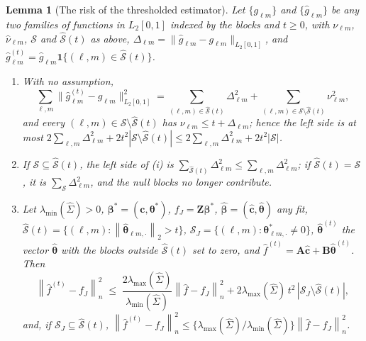 \documentclass[10pt]{book}
\newtheorem{lemma}{Lemma}[section]
\theoremstyle{definition}
\newcommand{\norm}[1]{\left\lVert #1 \right\rVert}
\newcommand{\normn}[1]{\left\lVert #1 \right\rVert_{n}}
\newcommand{\cv}{\ell}
\newcommand{\md}{m}
\newcommand{\bZ}{\mathbf{Z}}
\newcommand{\gcomp}[2]{g_{#1#2}}
\newcommand{\btheta}{\boldsymbol{\theta}}
\newcommand{\thetastar}{\btheta^{*}}
\newcommand{\thetahat}{\widehat{\btheta}}
\newcommand{\bbeta}{\boldsymbol{\beta}}
\newcommand{\betastar}{\bbeta^{*}}
\newcommand{\betahat}{\widehat{\bbeta}}
\newcommand{\bc}{\mathbf{c}}
\newcommand{\chat}{\widehat{\mathbf{c}}}
\newcommand{\Gramhat}{\widehat{\Sigma}}
\newcommand{\Amat}{\mathbf{A}}
\newcommand{\Bmat}{\mathbf{B}}
\newcommand{\lmin}{\lambda_{\min}}
\newcommand{\lmaxx}{\lambda_{\max}}
\newcommand{\Dbl}{\Delta_{\cv\md}}
\begin{document}
{%
\begin{lemma}[The risk of the thresholded estimator]
\label{lem:thrisk}
Let $\{\gcomp{\cv}{\md}\}$ and $\{\widehat{g}_{\cv\md}\}$ be any two families of
functions in $L_2[0,1]$ indexed by the blocks and $t \ge 0$, with
$\nu_{\cv\md}$, $\widehat{\nu}_{\cv\md}$, $\mathcal{S}$ and
$\widehat{\mathcal{S}}(t)$ as above, $\Dbl = \lVert\widehat{g}_{\cv\md} -
\gcomp{\cv}{\md}\rVert_{L_2[0,1]}$, and
$\widehat{g}^{(t)}_{\cv\md} = \widehat{g}_{\cv\md}
\mathbf{1}\{(\cv,\md)\in\widehat{\mathcal{S}}(t)\}$.
\begin{enumerate}
\item[(i)] With no assumption,
\[
  \sum_{\cv,\md}\bigl\lVert\widehat{g}^{(t)}_{\cv\md}-\gcomp{\cv}{\md}
  \bigr\rVert_{L_2[0,1]}^{2}
  = \sum_{(\cv,\md)\in\widehat{\mathcal{S}}(t)}\Dbl^{2}
  + \sum_{(\cv,\md)\in\mathcal{S}\setminus\widehat{\mathcal{S}}(t)}\nu_{\cv\md}^{2},
\]
and every $(\cv,\md) \in \mathcal{S}\setminus\widehat{\mathcal{S}}(t)$ has
$\nu_{\cv\md} \le t + \Dbl$; hence the left side is at most
$2\sum_{\cv,\md}\Dbl^{2} + 2t^{2}|\mathcal{S}\setminus\widehat{\mathcal{S}}(t)|
\le 2\sum_{\cv,\md}\Dbl^{2} + 2t^{2}|\mathcal{S}|$.
\item[(ii)] If $\mathcal{S} \subseteq \widehat{\mathcal{S}}(t)$, the left side
of (i) is $\sum_{\widehat{\mathcal{S}}(t)}\Dbl^{2} \le \sum_{\cv,\md}\Dbl^{2}$;
if $\widehat{\mathcal{S}}(t) = \mathcal{S}$, it is $\sum_{\mathcal{S}}\Dbl^{2}$,
and the null blocks no longer contribute.
\item[(iii)] Let $\lmin(\Gramhat) > 0$, $\betastar = (\bc,\thetastar)$,
$f_J = \bZ\betastar$, $\betahat = (\chat,\thetahat)$ any fit,
$\widehat{\mathcal{S}}(t) = \{(\cv,\md) : \norm{\thetahat_{\cv\md,\cdot}}_{2} > t\}$,
$\mathcal{S}_J = \{(\cv,\md) : \thetastar_{\cv\md,\cdot} \ne 0\}$,
$\thetahat^{(t)}$ the vector $\thetahat$ with the blocks outside
$\widehat{\mathcal{S}}(t)$ set to zero, and
$\widehat{f}^{(t)} = \Amat\chat + \Bmat\thetahat^{(t)}$. Then
\[
  \normn{\widehat{f}^{(t)}-f_J}^{2} \;\le\;
  \frac{2\lmaxx(\Gramhat)}{\lmin(\Gramhat)}\normn{\widehat{f}-f_J}^{2}
  + 2\lmaxx(\Gramhat)\,t^{2}\,|\mathcal{S}_J\setminus\widehat{\mathcal{S}}(t)|,
\]
and, if $\mathcal{S}_J \subseteq \widehat{\mathcal{S}}(t)$,
$\normn{\widehat{f}^{(t)}-f_J}^{2} \le
\{\lmaxx(\Gramhat)/\lmin(\Gramhat)\}\normn{\widehat{f}-f_J}^{2}$.
\end{enumerate}
\end{lemma}

}
\end{document}
